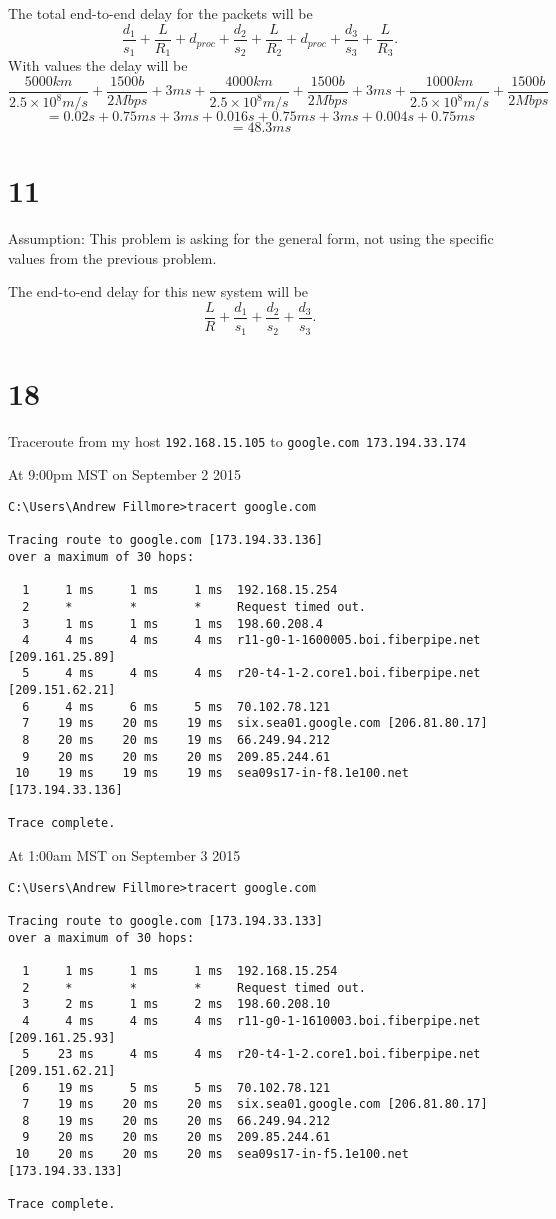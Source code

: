 \documentclass[12pt,letterpaper]{article}
\begin{document}
The total end-to-end delay for the packets will be
$$\frac{d_1}{s_1}+\frac{L}{R_1}+d_{proc}+\frac{d_2}{s_2}+\frac{L}{R_2}+d_{proc}+\frac{d_3}{s_3}+\frac{L}{R_3}.$$
With values the delay will be
$$\frac{5000km}{2.5\times10^8m/s}+\frac{1500b}{2Mbps}+3ms+\frac{4000km}{2.5\times10^8m/s}+\frac{1500b}{2Mbps}+3ms+\frac{1000km}{2.5\times10^8m/s}+\frac{1500b}{2Mbps}$$
$$=0.02s+0.75ms+3ms+0.016s+0.75ms+3ms+0.004s+0.75ms$$
$$=48.3ms$$
\section*{11}

Assumption: This problem is asking for the general form, not using the specific values from the previous problem.

The end-to-end delay for this new system will be
$$\frac{L}{R}+\frac{d_1}{s_1}+\frac{d_2}{s_2}+\frac{d_3}{s_3}.$$
\section*{18}
Traceroute from my host \verb!192.168.15.105! to \verb!google.com 173.194.33.174!

At 9:00pm MST on September 2 2015
\begin{verbatim}
C:\Users\Andrew Fillmore>tracert google.com

Tracing route to google.com [173.194.33.136]
over a maximum of 30 hops:

  1     1 ms     1 ms     1 ms  192.168.15.254
  2     *        *        *     Request timed out.
  3     1 ms     1 ms     1 ms  198.60.208.4
  4     4 ms     4 ms     4 ms  r11-g0-1-1600005.boi.fiberpipe.net [209.161.25.89]
  5     4 ms     4 ms     4 ms  r20-t4-1-2.core1.boi.fiberpipe.net [209.151.62.21]
  6     4 ms     6 ms     5 ms  70.102.78.121
  7    19 ms    20 ms    19 ms  six.sea01.google.com [206.81.80.17]
  8    20 ms    20 ms    19 ms  66.249.94.212
  9    20 ms    20 ms    20 ms  209.85.244.61
 10    19 ms    19 ms    19 ms  sea09s17-in-f8.1e100.net [173.194.33.136]

Trace complete.
\end{verbatim}

At 1:00am MST on September 3 2015
\begin{verbatim}
C:\Users\Andrew Fillmore>tracert google.com

Tracing route to google.com [173.194.33.133]
over a maximum of 30 hops:

  1     1 ms     1 ms     1 ms  192.168.15.254
  2     *        *        *     Request timed out.
  3     2 ms     1 ms     2 ms  198.60.208.10
  4     4 ms     4 ms     4 ms  r11-g0-1-1610003.boi.fiberpipe.net [209.161.25.93]
  5    23 ms     4 ms     4 ms  r20-t4-1-2.core1.boi.fiberpipe.net [209.151.62.21]
  6    19 ms     5 ms     5 ms  70.102.78.121
  7    19 ms    20 ms    20 ms  six.sea01.google.com [206.81.80.17]
  8    19 ms    20 ms    20 ms  66.249.94.212
  9    20 ms    20 ms    20 ms  209.85.244.61
 10    20 ms    20 ms    20 ms  sea09s17-in-f5.1e100.net [173.194.33.133]

Trace complete.
\end{verbatim}
\end{document}
